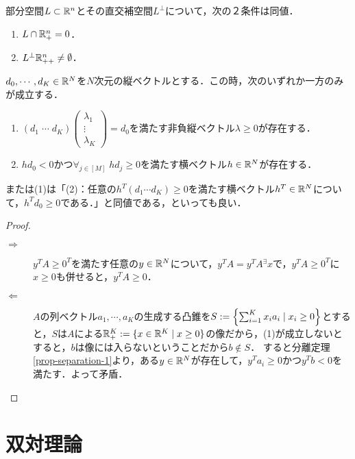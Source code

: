\documentclass[uplatex,dvipdfmx]{jsreport}
\begin{document}
\begin{lemma}
    部分空間$L\subset\mathbb{R}^n$とその直交補空間$L^\perp$について，次の２条件は同値．
    \begin{enumerate}
        \item $L\cap\mathbb{R}^n_+=0$．
        \item $L^\perp\mathbb{R}^n_{++}\ne\emptyset$．
    \end{enumerate}
\end{lemma}

\begin{theorem}
    $d_0,\cdots,d_K\in\mathbb{R}^N$を$N$次元の縦ベクトルとする．この時，次のいずれか一方のみが成立する．
    \begin{enumerate}
        \item $(d_1\;\cdots\;d_K)\begin{pmatrix}\lambda_1\\\vdots\\\lambda_K\end{pmatrix}=d_0$を満たす非負縦ベクトル$\lambda\ge 0$が存在する．
        \item $hd_0<0$かつ$\forall_{j\in[M]}\;hd_j\ge 0$を満たす横ベクトル$h\in\mathbb{R}^N$が存在する．
    \end{enumerate}
    または(1)は「(2)：任意の$h^T(d_1\cdots d_K)\ge 0$を満たす横ベクトル$h^T\in\mathbb{R}^N$について，$h^Td_0\ge 0$である．」と同値である，といっても良い．
\end{theorem}
\begin{proof}\mbox{}
    \begin{description}
        \item[$\Rightarrow$] $y^TA\ge 0^T$を満たす任意の$y\in\mathbb{R}^N$について，$y^TA=y^TA{}^\exists x$で，$y^TA\ge 0^T$に$x\ge 0$も併せると，$y^TA\ge 0$．
        \item[$\Leftarrow$] $A$の列ベクトル$a_1,\cdots,a_K$の生成する凸錐を$S:=\left\{\sum^K_{i=1}x_ia_i\mid x_i\ge 0\right\}$とすると，$S$は$A$による$\mathbb{R}^K_+:=\{x\in\mathbb{R}^K\mid x\ge 0\}$の像だから，(1)が成立しないとすると，$b$は像には入らないということだから$b\notin S$．
        すると分離定理\ref{prop-separation-1}より，ある$y\in\mathbb{R}^N$が存在して，$y^Ta_i\ge 0$かつ$y^Tb<0$を満たす．よって矛盾．
    \end{description}
\end{proof}

\chapter{双対理論}
\end{document}
